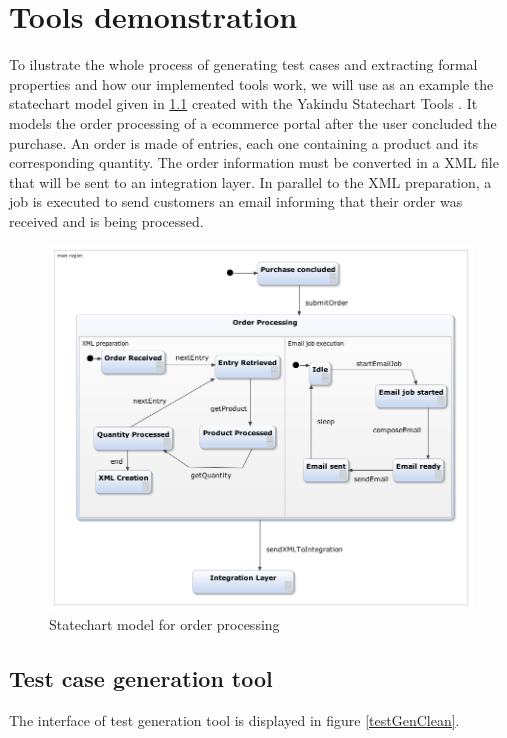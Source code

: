 \chapter{Tools demonstration}
\label{cap:casestudy}

To ilustrate the whole process of generating test cases and extracting formal properties and how our implemented tools work, we will use as an example the statechart model given in \ref{webOrderProc} created with the Yakindu Statechart Tools \cite{Yakindu}. It models the order processing of a ecommerce portal after the user concluded the purchase. An order is made of entries, each one containing a product and its corresponding quantity. The order information must be converted in a XML file that will be sent to an integration layer. In parallel to the XML preparation, a job is executed to send customers an email informing that their order was received and is being processed.

\begin{figure}[htb]
\centering
\includegraphics[width=15cm]{figuras/webOrderProc}
\caption{\label{webOrderProc}Statechart model for order processing}
\end{figure}

\section{Test case generation tool}

The interface of test generation tool is displayed in figure \ref{testGenClean}.

